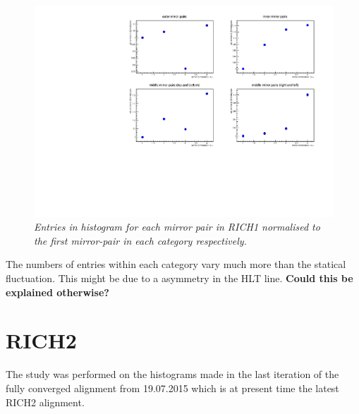 \begin{figure}[!h]
	\vspace*{-1.5cm}
	\begin{center}
		\includegraphics[width=1.\textwidth]{relentries_rich1.pdf}
		\vspace*{-1.5cm}
	\end{center}
	\caption{\textit{Entries in histogram for each mirror pair in RICH1 normalised to the first mirror-pair in each category respectively.} }
	\label{fig:rich1relentries}
\end{figure}

The numbers of entries within each category vary much more than the statical fluctuation. This might be due to a asymmetry in the HLT line. \textbf{Could this be explained otherwise?}

\clearpage

\section{RICH2}
The study was performed on the histograms made in the last iteration of the fully converged alignment from 19.07.2015 which is at present time the latest RICH2 alignment.\\
\\ 
